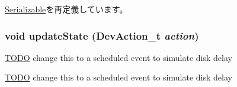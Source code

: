 \hyperlink{classSerializable_af100c4e9feabf3cd918619c88c718387}{Serializable}を再定義しています。\hypertarget{classIdeDisk_a24fb6794cfae6f84b380080e7501959e}{
\subsubsection[{updateState}]{\setlength{\rightskip}{0pt plus 5cm}void updateState ({\bf DevAction\_\-t} {\em action})}}
\label{classIdeDisk_a24fb6794cfae6f84b380080e7501959e}


\begin{Desc}
\item[\hyperlink{todo__todo000060}{TODO}]change this to a scheduled event to simulate disk delay \end{Desc}


\begin{Desc}
\item[\hyperlink{todo__todo000061}{TODO}]change this to a scheduled event to simulate disk delay \end{Desc}




